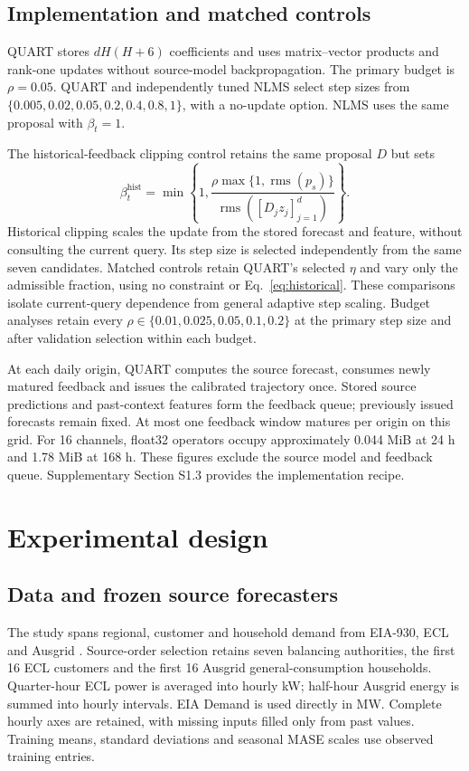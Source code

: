 \documentclass[preprint,12pt,times,nonatbib]{elsarticle}
\newcommand{\rms}{\operatorname{rms}}
\begin{document}
\subsection{Implementation and matched controls}
QUART stores $dH(H+6)$ coefficients and uses matrix--vector products and rank-one updates without source-model backpropagation. The primary budget is $\rho=0.05$. QUART and independently tuned NLMS select step sizes from $\{0.005,0.02,0.05,0.2,0.4,0.8,1\}$, with a no-update option. NLMS uses the same proposal with $\beta_t=1$.

The historical-feedback clipping control retains the same proposal $D$ but sets
\begin{equation}\label{eq:historical}
 \beta_t^{\mathrm{hist}}=\min\left\{1,
 \frac{\rho\max\{1,\rms(p_s)\}}{\rms([D_jz_j]_{j=1}^d)}\right\}.
\end{equation}
Historical clipping scales the update from the stored forecast and feature, without consulting the current query. Its step size is selected independently from the same seven candidates. Matched controls retain QUART's selected $\eta$ and vary only the admissible fraction, using no constraint or Eq.~\eqref{eq:historical}. These comparisons isolate current-query dependence from general adaptive step scaling. Budget analyses retain every $\rho\in\{0.01,0.025,0.05,0.1,0.2\}$ at the primary step size and after validation selection within each budget.

At each daily origin, QUART computes the source forecast, consumes newly matured feedback and issues the calibrated trajectory once. Stored source predictions and past-context features form the feedback queue; previously issued forecasts remain fixed. At most one feedback window matures per origin on this grid. For 16 channels, float32 operators occupy approximately 0.044 MiB at 24 h and 1.78 MiB at 168 h. These figures exclude the source model and feedback queue. Supplementary Section S1.3 provides the implementation recipe.

\section{Experimental design}
\subsection{Data and frozen source forecasters}
The study spans regional, customer and household demand from EIA-930, ECL and Ausgrid \parencite{eia9302026,uci2015ecl,ratnam2015ausgrid}. Source-order selection retains seven balancing authorities, the first 16 ECL customers and the first 16 Ausgrid general-consumption households. Quarter-hour ECL power is averaged into hourly kW; half-hour Ausgrid energy is summed into hourly intervals. EIA Demand is used directly in MW. Complete hourly axes are retained, with missing inputs filled only from past values. Training means, standard deviations and seasonal MASE scales use observed training entries.
\end{document}
